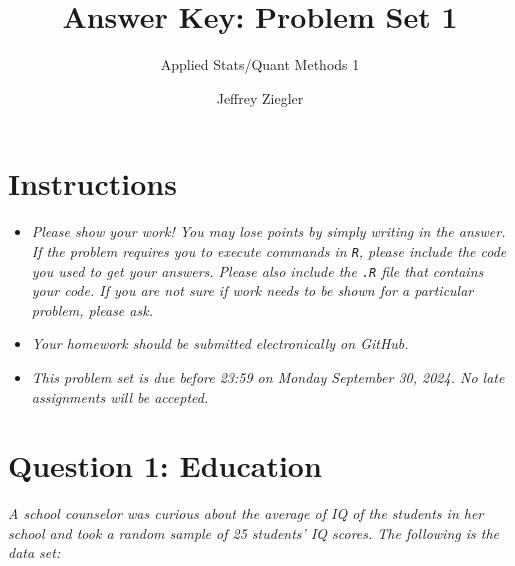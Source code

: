 \documentclass[12pt,letterpaper]{article}
\title{Answer Key: Problem Set 1}
\date{Jeffrey Ziegler}
\author{Applied Stats/Quant Methods 1}
\begin{document}
	\maketitle
	
	\section*{Instructions}
\begin{itemize}
	\item \textit{Please show your work! You may lose points by simply writing in the answer. If the problem requires you to execute commands in \texttt{R}, please include the code you used to get your answers. Please also include the \texttt{.R} file that contains your code. If you are not sure if work needs to be shown for a particular problem, please ask.}
	\item \textit{Your homework should be submitted electronically on GitHub.}
	\item \textit{This problem set is due before 23:59 on Monday September 30, 2024. No late assignments will be accepted.}

\end{itemize}

\vspace{1cm}
\section*{Question 1: Education}

\textit{A school counselor was curious about the average of IQ of the students in her school and took a random sample of 25 students' IQ scores. The following is the data set:}\\
\vspace{.25cm}

  

\vspace{.5cm}
\end{document}
